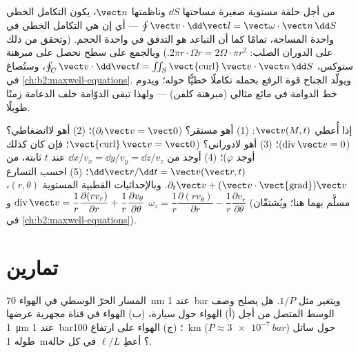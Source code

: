 \begin{remark}\label{rem:b2:fluid-kinematics:stokes}
من أجل حلقة مستوية صغيرة مساحتها $\dd S$ وناظمتها $\vect n$، يكون
التكامل الخطي $\oint\vect v\cdot\dd\vect l = \vect\omega\cdot\vect n\,\dd S$ ---
أي إن  هي التكامل الخطي في واحدة المساحة، تمامًا كما أن
التباعد هو التدفق في واحدة الحجم. (وتحقق من ذلك على الدوران
الصلب: $2\pi r\cdot\Omega r = 2\Omega\cdot\pi r^2$.) وبالجمع على سطح
نحصل على مبرهنة ستوكس، $\oint_C\vect v\cdot\dd\vect l = \iint_S
\operatorname{\vect{curl}}\vect v\cdot\vect n\,\dd S$، وستُصاغ في
\cref{ch:b2:maxwell-equations}. ويولّد الجناح قوة الرفع بحمله
تكاملًا خطيًّا حوله؛ ويدوم خط الدوامة في مائع مثالي (مبرهنة
كلفن) --- ولهذا تبقى الدوّامة خلف الدعامة زمنًا طويلًا.
\end{remark}

\begin{method}\label{met:b2:fluid-kinematics:reading}
إذا أُعطي $\vect v(M, t)$: (1) أهو مستقر؟ ($\partial_t\vect v = \vect 0$)؛ (2)
أهو لاانضغاطي؟ ($\operatorname{div}\vect v = 0$)؛ (3) أهو
لادوراني؟ ($\operatorname{\vect{curl}}\vect v = \vect 0$؛ فإن كان كذلك
أوجد $\varphi$)؛ (4) أوجد  من $\dd x/v_x = \dd y/v_y = \dd z/
v_z$ عند $t$ ثابتة،  من $\dd\vect r/\dd t = \vect v(\vect r,
t)$؛ (5) احسب التسارع $\partial_t\vect v + (\vect v\cdot
\operatorname{\vect{grad}})\vect v$. وبالإحداثيات القطبية المستوية $(r, \theta)$،
$\operatorname{div}\vect v = \dfrac1r\dfrac{\partial(rv_r)}{\partial r} + \dfrac1r
\dfrac{\partial v_\theta}{\partial\theta}$ و $\omega_z = \dfrac1r\dfrac{\partial(rv_\theta)}
{\partial r} - \dfrac1r\dfrac{\partial v_r}{\partial\theta}$ (مسلَّم بهما هنا؛
ويُشتقّان في \cref{ch:b2:maxwell-equations}).
\end{method}

\section{تمارين}

\begin{exercise}[$\star$]\label{exo:b2:fluid-kinematics:1}
المسار الحرّ الوسطي في الهواء \qty{70}{nm} عند \qty{1}{bar} ويتغير
مثل $1/P$. هل يصلح وصف الوسط المتصل من أجل (أ) الهواء حول سيارة،
(ب) الهواء في قناة مجهرية عرضها \qty{1}{\micro m} عند \qty{1}{bar}؛
(ج) الهواء على ارتفاع \qty{100}{km} ($P \approx \qty{3e-7}{bar}$) حول
ساتل طوله \qty{1}{m}؟ أعطِ $\ell/L$ في كل حالة.
\end{exercise}

